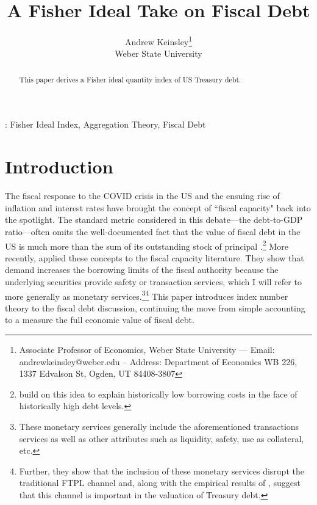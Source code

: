 \documentclass[11pt,a4paper,margin=1.5in]{article}
\title{A Fisher Ideal Take on Fiscal Debt}
\author{Andrew Keinsley\thanks{Associate Professor of Economics, Weber State University --- Email: andrewkeinsley@weber.edu -- Address: Department of Economics WB 226, 1337 Edvalson St, Ogden, UT 84408-3807 } \\  {\small Weber State University}}
\begin{document}
\maketitle
\thispagestyle{empty}

\begin{abstract}
\noindent This paper derives a Fisher ideal quantity index of US Treasury debt.

\end{abstract}
\vspace{2em}

: Fisher Ideal Index, Aggregation Theory, Fiscal Debt
\newpage
\setcounter{page}{1}


\section{Introduction}

The fiscal response to the COVID crisis in the US and the ensuing rise of inflation and interest rates have brought the concept of ``fiscal capacity" back into the spotlight. 
The standard metric considered in this debate---the debt-to-GDP ratio---often omits the well-documented fact that the value of fiscal debt in the US is much more than the sum of its outstanding stock of principal \citep[][to name just a few]{Krishnamurthy-VissingJorgensen:2012,Krishnamurthy-VissingJorgensen:2013,Nagel:2016}.\footnote{
	\citet*{Caballero-Farhi-Gourinchas:2017} build on this idea to explain historically low borrowing costs in the face of historically high debt levels.
}
More recently, \citet*{Brunnermeier-Merkel-Sannikov:2022} applied these concepts to the fiscal capacity literature. 
They show that demand increases the borrowing limits of the fiscal authority because the underlying securities provide safety or transaction services, which I will refer to more generally as monetary services.\footnote{
	These monetary services generally include the aforementioned transactions services as well as other attributes such as liquidity, safety, use as collateral, etc.}\footnote{
		Further, they show that the inclusion of these monetary services disrupt the traditional FTPL channel \citep[see][as a seminal example]{Leeper:1991} and, along with the empirical results of \citet{Jiang-etal:2019}, suggest that this channel is important in the valuation of Treasury debt. 
	}
This paper introduces index number theory to the fiscal debt discussion, continuing the move from simple accounting to a measure the full economic value of fiscal debt.
\end{document}
